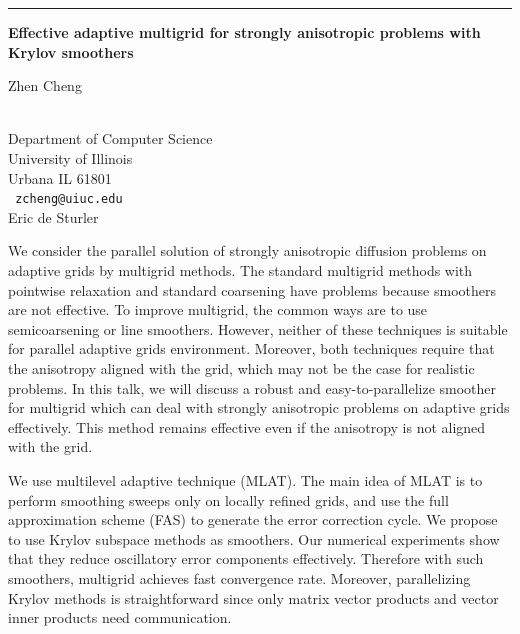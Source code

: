 \documentclass[twosided]{report}
\begin{document}
\begin{center} \rule{6in}{1pt} \end{center}
\newpage	%

\begin{center}
{\large			\label{cheng}
{\bf
Effective adaptive multigrid for strongly anisotropic problems with
Krylov smoothers
}

Zhen Cheng} \\
Department of Computer Science
\\
University of Illinois
\\
Urbana IL 61801
\\ {\tt
zcheng@uiuc.edu
}
\\
Eric de Sturler
\end{center}

We consider the parallel solution of strongly anisotropic diffusion
problems on adaptive grids by multigrid methods. The standard multigrid
methods with pointwise relaxation and standard coarsening have problems
because smoothers are not effective. To improve multigrid, the common
ways are to use semicoarsening or line smoothers. However, neither of
these techniques is suitable for parallel adaptive grids environment.
Moreover, both techniques require that the anisotropy aligned with the
grid, which may not be the case for realistic problems. In this talk,
we will discuss a robust and easy-to-parallelize smoother for multigrid
which can deal with strongly anisotropic problems on adaptive grids
effectively. This method remains effective even if the anisotropy is
not aligned with the grid.

We use multilevel adaptive technique (MLAT). The main idea of MLAT is
to perform smoothing sweeps only on locally refined grids, and use the
full approximation scheme (FAS) to generate the error correction cycle.
We propose to use Krylov subspace methods as smoothers. Our numerical
experiments show that they reduce oscillatory error components
effectively. Therefore with such smoothers, multigrid achieves fast
convergence rate. Moreover, parallelizing Krylov methods is
straightforward since only matrix vector products and vector inner
products need communication.
\end{document}

